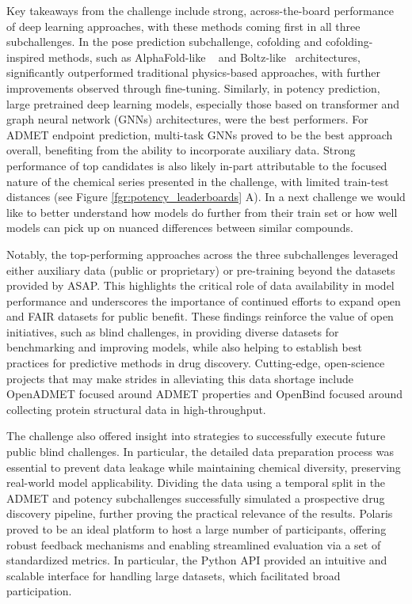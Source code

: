 \documentclass[journal=jcim,manuscript=article]{achemso}
\begin{document}
Key takeaways from the challenge include strong, across-the-board performance of deep learning approaches, with these methods coming first in all three subchallenges. In the pose prediction subchallenge, cofolding and cofolding-inspired methods, such as AlphaFold-like ~\cite{abramson_2024_alphafold} and Boltz-like~\cite{wohlwend_2024_boltz-1, passaro_2025_boltz-2} architectures, significantly outperformed traditional physics-based approaches, with further improvements observed through fine-tuning. Similarly, in potency prediction, large pretrained deep learning models, especially those based on transformer and graph neural network (GNNs) architectures, were the best performers. For ADMET endpoint prediction, multi-task GNNs proved to be the best approach overall, benefiting from the ability to incorporate auxiliary data. Strong performance of top candidates is also likely in-part attributable to the focused nature of the chemical series presented in the challenge, with limited train-test distances (see Figure \ref{fgr:potency_leaderboards} A). In a next challenge we would like to better understand how models do further from their train set or how well models can pick up on nuanced differences between similar compounds.

Notably, the top-performing approaches across the three subchallenges leveraged either auxiliary data (public or proprietary) or pre-training beyond the datasets provided by ASAP. This highlights the critical role of data availability in model performance and underscores the importance of continued efforts to expand open and FAIR\cite{wilkinson_fair_2016} datasets for public benefit. These findings reinforce the value of open initiatives, such as blind challenges, in providing diverse datasets for benchmarking and improving models, while also helping to establish best practices for predictive methods in drug discovery. Cutting-edge, open-science projects that may make strides in alleviating this data shortage include OpenADMET\cite{openadmet_2025} focused around ADMET properties and OpenBind\cite{openbind_2025} focused around collecting protein structural data in high-throughput.

The challenge also offered insight into strategies to successfully execute future public blind challenges. In particular, the detailed data preparation process was essential to prevent data leakage while maintaining chemical diversity, preserving real-world model applicability. Dividing the data using a temporal split in the ADMET and potency subchallenges successfully simulated a prospective drug discovery pipeline, further proving the practical relevance of the results.
Polaris proved to be an ideal platform to host a large number of participants, offering robust feedback mechanisms and enabling streamlined evaluation via a set of standardized metrics. In particular, the Python API provided an intuitive and scalable interface for handling large datasets, which facilitated broad participation. 
\end{document}
